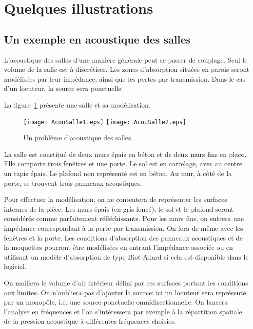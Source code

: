 \medskip
\section{Quelques illustrations}\label{Sec-AcouIllus}

\medskip
\subsection{Un exemple en acoustique des salles}

L'acoustique des salles d'une manière générale peut se passer de couplage. Seul le volume de la salle est à discrétiser. Les zones d'absorption situées en parois seront modélisées par leur impédance, ainsi que les pertes par transmission. Dans le cas d'un locuteur, la source sera ponctuelle.

La figure~\ref{Fig-AcouSalle} présente une salle et sa modélisation.
\begin{figure}[h!]
\centering
\texttt{[image: AcouSalle1.eps]}\hspace{10mm}
\texttt{[image: AcouSalle2.eps]}
\caption{Un problème d'acoustique des salles}\label{Fig-AcouSalle}
\end{figure}
La salle est constitué de deux murs épais en béton et de deux murs fins en placo. Elle comporte trois fenêtres et une porte. Le sol est en carrelage, avec au centre un tapis épais. Le plafond non représenté est en béton. Au mur, à côté de la porte, se trouvent trois panneaux acoustiques.

Pour effectuer la modélisation, on ne contentera de représenter les surfaces internes de la pièce. Les murs épais (en gris foncé), le sol et le plafond seront considérés comme parfaitement réfléchissants. Pour les murs fins, on entrera une impédance correspondant à la perte par transmission. On fera de même avec les fenêtres et la porte. Les conditions d'absorption des panneaux acoustiques et de la moquettes pourront être modélisées en entrant l'impédance associée ou en utilisant un modèle d'absorption de type Biot-Allard si cela est disponible dans le logiciel.

On maillera le volume d'air intérieur défini par ces surfaces portant les conditions aux limites. On n'oubliera pas d'ajouter la source: ici un locuteur sera représenté par un monopôle, i.e. une source ponctuelle omnidirectionnelle. On lancera l'analyse en fréquences et l'on s'intéressera par exemple à la répartition spatiale de la pression acoustique à différentes fréquences choisies.


